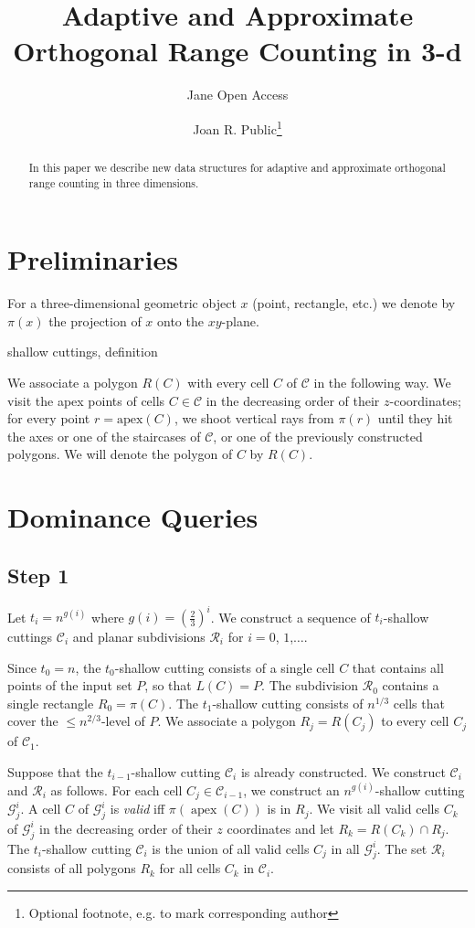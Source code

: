 \documentclass[anonymous,a4paper,USenglish,cleveref,autoref,thm-restate] {socg-lipics-v2021}
\title{Adaptive and Approximate Orthogonal Range Counting in 3-d}
\author{Jane {Open Access}}{Dummy University Computing Laboratory, [optional: Address], Country \and My second affiliation, Country \and \url{http://www.myhomepage.edu} }{johnqpublic@dummyuni.org}{https://orcid.org/0000-0002-1825-0097}{(Optional) author-specific funding acknowledgements}%
\author{Joan R. Public\footnote{Optional footnote, e.g. to mark corresponding author}}{Department of Informatics, Dummy College, [optional: Address], Country}{joanrpublic@dummycollege.org}{[orcid]}{[funding]}
\newcommand{\apex}{\operatorname{apex}}
\newcommand{\cC}{\mathcal{C}}
\newcommand{\cG}{\mathcal{G}}
\newcommand{\cR}{\mathcal{R}}
\begin{document}
\maketitle
\begin{abstract}
In this paper we describe new data structures for  adaptive and approximate orthogonal range counting in three dimensions.   
\end{abstract}
\section{Preliminaries}
\label{sec:prelim}
For a three-dimensional geometric object $x$ (point, rectangle, etc.) we denote by $\pi(x)$ the projection of $x$ onto the $xy$-plane. 

shallow cuttings, definition

We associate a polygon $R(C)$ with every cell $C$ of $\cC$ in the following way. We visit  the apex points of cells $C\in \cC$ in the decreasing order of their $z$-coordinates; for every point $r=\mathrm{apex}(C)$, we shoot vertical rays from $\pi(r)$ until they hit the axes or one of the staircases of $\cC$, or one of the previously constructed polygons. We will denote the polygon of $C$ by $R(C)$.   

\section{Dominance Queries}
\label{sec:domin-approx}
\subsection{Step 1}
\label{sec:step1}
Let $t_i=n^{g(i)}$ where $g(i)=(\frac{2}{3})^i$. We construct a sequence of $t_i$-shallow cuttings $\cC_i$ and  planar  subdivisions $\cR_i$ for $i=0$, $1$,$\ldots$.

Since $t_0=n$, the $t_0$-shallow cutting consists of a single cell $C$  that contains all points of the input set $P$, so that $L(C)=P$. The subdivision $\cR_0$ contains a single rectangle $R_0=\pi(C)$.  The $t_1$-shallow cutting consists of $n^{1/3}$ cells that cover the $\leq n^{2/3}$-level of $P$. We associate a polygon $R_j=R(C_j)$ to every cell $C_j$ of $\cC_1$. 

Suppose that the $t_{i-1}$-shallow cutting $\cC_i$ is already constructed. We construct $\cC_i$ and $\cR_i$ as follows. For each cell $C_j\in \cC_{i-1}$, we construct an $n^{g(i)}$-shallow cutting  $\cG^i_j$.  A cell $C$ of $\cG^i_j$ is \emph{valid} iff $\pi(\apex(C))$ is in $R_j$.
We visit all valid cells $C_k$ of $\cG^i_j$ in the decreasing order of their $z$ coordinates and let $R_k=R(C_k)\cap R_j$. The $t_i$-shallow cutting $\cC_i$ is the union of all  valid cells $C_j$ in all $\cG^i_j$. The set $\cR_i$ consists of all polygons $R_k$ for all cells $C_k$ in $\cC_i$. 
\end{document}
